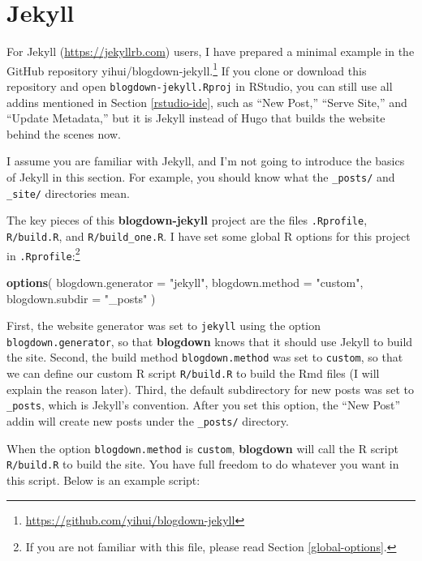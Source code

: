 \documentclass[12pt,]{krantz}
\makeatletter
\newenvironment{Shaded}{\begin{snugshade}}{\end{snugshade}}
\newcommand{\DataTypeTok}[1]{\textcolor[rgb]{0.13,0.29,0.53}{#1}}
\newcommand{\KeywordTok}[1]{\textcolor[rgb]{0.13,0.29,0.53}{\textbf{#1}}}
\newcommand{\NormalTok}[1]{#1}
\newcommand{\StringTok}[1]{\textcolor[rgb]{0.31,0.60,0.02}{#1}}
\renewcommand{\href}[2]{#2\footnote{\url{#1}}}
\newenvironment{kframe}{%
\medskip{}
\setlength{\fboxsep}{.8em}
 \def\at@end@of@kframe{}%
 \ifinner\ifhmode%
  \def\at@end@of@kframe{\end{minipage}}%
  \begin{minipage}{\columnwidth}%
 \fi\fi%
 \def\FrameCommand##1{\hskip\@totalleftmargin \hskip-\fboxsep
 \colorbox{shadecolor}{##1}\hskip-\fboxsep
     \hskip-\linewidth \hskip-\@totalleftmargin \hskip\columnwidth}%
 \MakeFramed {\advance\hsize-\width
   \@totalleftmargin\z@ \linewidth\hsize
   \@setminipage}}%
 {\par\unskip\endMakeFramed%
 \at@end@of@kframe}
\renewenvironment{Shaded}{\begin{kframe}}{\end{kframe}}
\theoremstyle{definition}
\theoremstyle{definition}
\theoremstyle{definition}
\theoremstyle{remark}
\makeatother
\begin{document}
\hypertarget{jekyll}{%
\section{Jekyll}\label{jekyll}}

For Jekyll (\url{https://jekyllrb.com}) users, I have
prepared a minimal example in the GitHub repository
\href{https://github.com/yihui/blogdown-jekyll}{yihui/blogdown-jekyll.}
If you clone or download this repository and open
\texttt{blogdown-jekyll.Rproj} in RStudio, you can still use all addins
mentioned in Section \ref{rstudio-ide}, such as ``New Post,'' ``Serve
Site,'' and ``Update Metadata,'' but it is Jekyll instead of Hugo that
builds the website behind the scenes now.

I assume you are familiar with Jekyll, and I'm not going to introduce
the basics of Jekyll in this section. For example, you should know what
the \texttt{\_posts/} and \texttt{\_site/} directories mean.

The key pieces of this \textbf{blogdown-jekyll} project are the files
\texttt{.Rprofile}, \texttt{R/build.R}, and \texttt{R/build\_one.R}. I
have set some global R options for this project in
\texttt{.Rprofile}:\footnote{If you are not familiar with this file,
  please read Section \ref{global-options}.}

\begin{Shaded}
\begin{Highlighting}[]
\KeywordTok{options}\NormalTok{(}
  \DataTypeTok{blogdown.generator =} \StringTok{"jekyll"}\NormalTok{,}
  \DataTypeTok{blogdown.method =} \StringTok{"custom"}\NormalTok{,}
  \DataTypeTok{blogdown.subdir =} \StringTok{"_posts"}
\NormalTok{)}
\end{Highlighting}
\end{Shaded}

First, the website generator was set to \texttt{jekyll} using the option
\texttt{blogdown.generator}, so that \textbf{blogdown} knows that it
should use Jekyll to build the site. Second, the build method
\texttt{blogdown.method} was set to \texttt{custom}, so that we can
define our custom R script \texttt{R/build.R} to build the Rmd files (I
will explain the reason later). Third, the default subdirectory for new
posts was set to \texttt{\_posts}, which is Jekyll's convention. After
you set this option, the ``New Post'' addin will create new posts under
the \texttt{\_posts/} directory.

When the option \texttt{blogdown.method} is \texttt{custom},
\textbf{blogdown} will call the R script \texttt{R/build.R} to build the
site. You have full freedom to do whatever you want in this script.
Below is an example script:
\end{document}
